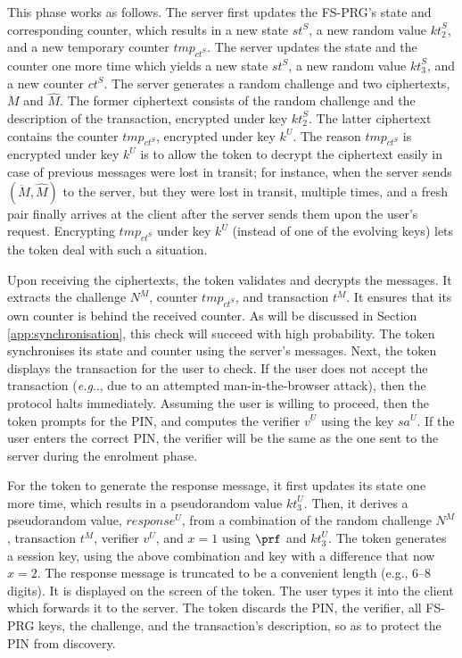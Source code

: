 \documentclass[runningheads]{llncs}
\makeatletter
\DeclareRobustCommand\onedot{\futurelet\@let@token\@onedot}
\def\@onedot{\ifx\@let@token.\else.\null\fi\xspace}
\def\eg{\emph{e.g}\onedot} \def\Eg{\emph{E.g}\onedot}
\newcommand{\sss}{\scriptscriptstyle}
\newcommand{\nonce}{\ensuremath{{N}}}
\newcommand{\keyt}{\ensuremath{{kt}}}
\newcommand{\counter}{\ensuremath{{ct}}}
\newcommand{\salt}{\ensuremath{{sa}}}
\newcommand{\trans}{\ensuremath{{t}}}
\renewcommand{\verifier}{\ensuremath{{v}}}
\renewcommand{\state}{\ensuremath{{st}}}
\newcommand{\VC}[1]{\ensuremath{#1^{\sss U}}}
\newcommand{\VS}[1]{\ensuremath{#1^{\sss S}}}
\newcommand{\VM}[1]{\ensuremath{#1^{\sss M}}}
\newcommand{\tmp}{\ensuremath{{tmp}}}
\makeatother
\begin{document}
This phase works as follows. The server first updates the FS-PRG's state and corresponding counter, which results in a new state \VS{\state}, a new random value  \VS{\keyt_{\sss 2}}, and a new temporary counter $\tmp_{\VS{\counter}}$. The server updates the state and the counter one more time which yields a new state \VS{\state}, a new random value \VS{\keyt_{\sss 3}}, and a new counter \VS{\counter}. The server generates a random challenge and two ciphertexts, $\ddot M$ and $\hat M$. The former ciphertext consists of the random challenge and the description of the transaction, encrypted under key \VS{\keyt_{\sss 2}}. The latter ciphertext contains the counter $\tmp_{\VS{\counter}}$, encrypted under key $\VC{k}$. The reason $\tmp_{\VS{\counter}}$ is encrypted under key $\VC{k}$ is to allow the token to decrypt the ciphertext easily 
in case of previous messages were lost in transit; for instance, when the server sends $(\ddot M, \hat M)$ to the server, but they were lost in transit, multiple times, and a fresh pair finally arrives at the client after the server sends them upon the user's request. Encrypting $\tmp_{\VS{\counter}}$ under key $\VC{k}$ (instead of one of the evolving keys) lets the token deal with such a situation. 




Upon receiving the ciphertexts, the token validates and decrypts the messages. It extracts the challenge \VM{\nonce}, counter $\tmp_{\VS{\counter}}$, and transaction \VM{\trans}. It ensures that its own counter is behind the received counter. As will be discussed in Section \ref{app:synchronisation}, this check will succeed with high probability. The token synchronises its state and counter using the server's messages. Next, the token displays the transaction for the user to check. If the user does not accept the transaction (\eg, due to an attempted man-in-the-browser attack), then the protocol halts immediately. Assuming the user is willing to proceed, then the token prompts for the PIN, and computes the verifier \VC{\verifier} using the key \VC{\salt}. If the user enters the correct PIN, the verifier will be the same as the one sent to the server during the enrolment phase.



For the token to generate the response message, it first updates its state one more time, which results in a pseudorandom value \VC{\keyt_{\sss 3}}. Then, it derives a pseudorandom value, \VC{\mathit{response}}, from a combination of the random challenge \VM{\nonce}, transaction \VM{\trans}, verifier \VC{\verifier}, and $x=1$  using $\prf$ and \VC{\keyt_{\sss 3}}. The token generates a session key, using the above combination and key with a difference that now $x=2$. The response message is truncated to be a convenient length (e.g., 6--8 digits). It is displayed on the screen of the token. The user types it into the client which forwards it to the server. The token discards the PIN, the verifier, all FS-PRG keys, the challenge, and the transaction's description, so as to protect the PIN from discovery. 
\end{document}
